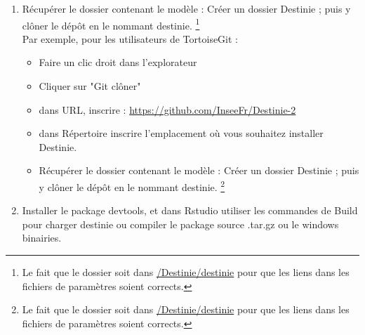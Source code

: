 \begin{enumerate}
\item Récupérer le dossier contenant le modèle : 
Créer un dossier Destinie ; puis y clôner le dépôt en le nommant destinie. \footnote{Le fait que le dossier soit dans \url{/Destinie/destinie} pour que les liens dans les fichiers de paramètres soient corrects.} \\
Par exemple, pour les utilisateurs de TortoiseGit :
\begin{itemize}
\item Faire un clic droit dans l'explorateur
\item Cliquer sur "Git clôner"
\item  dans URL, inscrire : \url{https://github.com/InseeFr/Destinie-2}
\item dans Répertoire inscrire l'emplacement où vous souhaitez installer Destinie. \item Récupérer le dossier contenant le modèle : 
Créer un dossier Destinie ; puis y clôner le dépôt en le nommant destinie. \footnote{Le fait que le dossier soit dans \url{/Destinie/destinie} pour que les liens dans les fichiers de paramètres soient corrects.} \\
\end{itemize}
% 
 
 \item  Installer le package devtools, et dans Rstudio utiliser les commandes de Build pour charger destinie ou compiler le package source .tar.gz ou le windows binairies. 
\end{enumerate}



